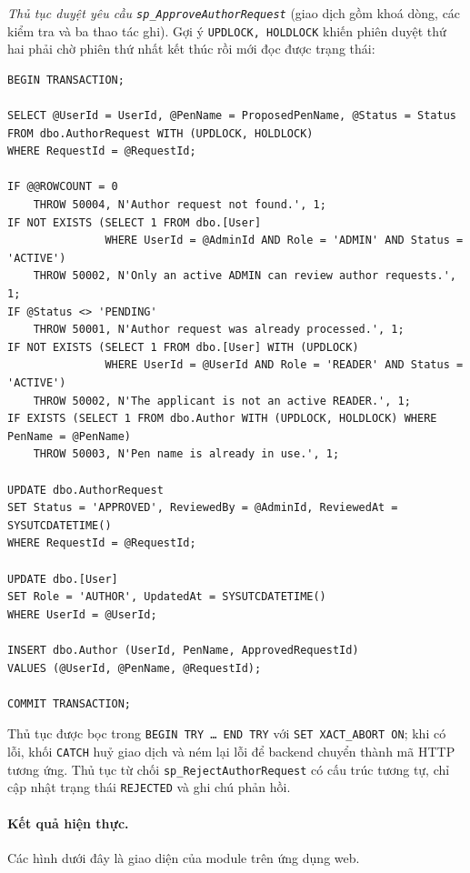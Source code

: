 \textit{Thủ tục duyệt yêu cầu \texttt{sp\_ApproveAuthorRequest}} (giao dịch gồm khoá dòng, các kiểm tra và ba thao tác ghi). Gợi ý \texttt{UPDLOCK, HOLDLOCK} khiến phiên duyệt thứ hai phải chờ phiên thứ nhất kết thúc rồi mới đọc được trạng thái:
\begin{verbatim}
BEGIN TRANSACTION;

SELECT @UserId = UserId, @PenName = ProposedPenName, @Status = Status
FROM dbo.AuthorRequest WITH (UPDLOCK, HOLDLOCK)
WHERE RequestId = @RequestId;

IF @@ROWCOUNT = 0
    THROW 50004, N'Author request not found.', 1;
IF NOT EXISTS (SELECT 1 FROM dbo.[User]
               WHERE UserId = @AdminId AND Role = 'ADMIN' AND Status = 'ACTIVE')
    THROW 50002, N'Only an active ADMIN can review author requests.', 1;
IF @Status <> 'PENDING'
    THROW 50001, N'Author request was already processed.', 1;
IF NOT EXISTS (SELECT 1 FROM dbo.[User] WITH (UPDLOCK)
               WHERE UserId = @UserId AND Role = 'READER' AND Status = 'ACTIVE')
    THROW 50002, N'The applicant is not an active READER.', 1;
IF EXISTS (SELECT 1 FROM dbo.Author WITH (UPDLOCK, HOLDLOCK) WHERE PenName = @PenName)
    THROW 50003, N'Pen name is already in use.', 1;

UPDATE dbo.AuthorRequest
SET Status = 'APPROVED', ReviewedBy = @AdminId, ReviewedAt = SYSUTCDATETIME()
WHERE RequestId = @RequestId;

UPDATE dbo.[User]
SET Role = 'AUTHOR', UpdatedAt = SYSUTCDATETIME()
WHERE UserId = @UserId;

INSERT dbo.Author (UserId, PenName, ApprovedRequestId)
VALUES (@UserId, @PenName, @RequestId);

COMMIT TRANSACTION;
\end{verbatim}
Thủ tục được bọc trong \texttt{BEGIN TRY \ldots{} END TRY} với \texttt{SET XACT\_ABORT ON}; khi có lỗi, khối \texttt{CATCH} huỷ giao dịch và ném lại lỗi để backend chuyển thành mã HTTP tương ứng. Thủ tục từ chối \texttt{sp\_RejectAuthorRequest} có cấu trúc tương tự, chỉ cập nhật trạng thái \texttt{REJECTED} và ghi chú phản hồi.

\paragraph{Kết quả hiện thực.} Các hình dưới đây là giao diện của module trên ứng dụng web.


